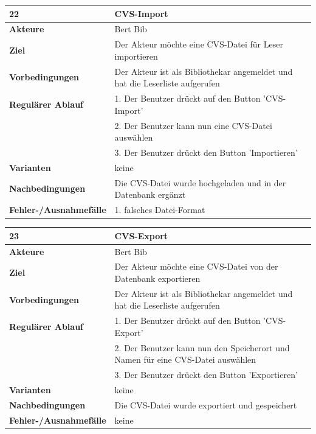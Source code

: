 \documentclass[fontsize=12pt,paper=a4,twoside]{scrartcl}
\begin{document}
\begin{table}[htbp]
\label{22}
\begin{tabular}{|l|p{10cm}|}
\hline 
\textbf{22} & \textbf{CVS-Import} \\ \hline
\textbf{Akteure} & Bert Bib\\ \hline
\textbf{Ziel} & Der Akteur möchte eine CVS-Datei für Leser importieren \\ \hline
\textbf{Vorbedingungen} & Der Akteur ist als Bibliothekar angemeldet und hat die Leserliste aufgerufen\\
\hline
\textbf{Regulärer Ablauf} & 
1. Der Benutzer drückt auf den Button 'CVS-Import' \\
&2. Der Benutzer kann nun eine CVS-Datei auswählen\\
&3. Der Benutzer drückt den Button 'Importieren'\\
\hline
\textbf{Varianten} & 
keine \\ \hline
\textbf{Nachbedingungen} & Die CVS-Datei wurde hochgeladen und in der Datenbank ergänzt\\ \hline
\textbf{Fehler-/Ausnahmefälle} & 1. falsches Datei-Format\\
\hline
\end{tabular}
\end{table}

\begin{table}[htbp]
\label{23}
\begin{tabular}{|l|p{10cm}|}
\hline 
\textbf{23} & \textbf{CVS-Export} \\ \hline
\textbf{Akteure} & Bert Bib\\ \hline
\textbf{Ziel} & Der Akteur möchte eine CVS-Datei von der Datenbank exportieren \\ \hline
\textbf{Vorbedingungen} & Der Akteur ist als Bibliothekar angemeldet und hat die Leserliste 
aufgerufen \\ \hline
\textbf{Regulärer Ablauf} & 
1. Der Benutzer drückt auf den Button 'CVS-Export' \\
&2. Der Benutzer kann nun den Speicherort und Namen für eine CVS-Datei auswählen\\
&3. Der Benutzer drückt den Button 'Exportieren'\\
\hline
\textbf{Varianten} & 
keine \\ \hline
\textbf{Nachbedingungen} & Die CVS-Datei wurde exportiert und gespeichert\\ \hline
\textbf{Fehler-/Ausnahmefälle} & keine\\
\hline
\end{tabular}
\end{table}
\end{document}
